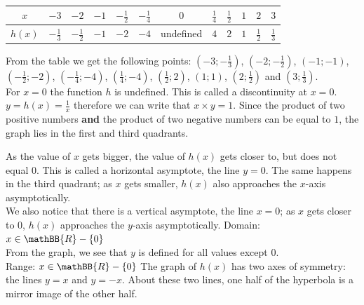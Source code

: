 \begin{wex}
{\\
\begin{table}[H]
\begin{center}
\begin{tabular}{|c|c|c|c|c|c|c|c|c|c|c|c|}
\hline
  $x$ &  $-3$ & $-2$ & $-1$ & $-\frac{1}{2}$ & $-\frac{1}{4}$ &$0$&$\frac{1}{4}$&$\frac{1}{2}$&$1$&$2$&$3$
\\ \hline
 $h(x)$& $-\frac{1}{3}$ &$-\frac{1}{2}$&$-1$&$-2$&$-4$&undefined&$4$&$2$&$1$&$\frac{1}{2}$&$\frac{1}{3}$
\\ \hline
\end{tabular}
\end{center}
\end{table}

From the table we get the following points: $(-3; -\frac{1}{3})$, $(-2; -\frac{1}{2})$, $(-1;-1)$, $(-\frac{1}{2}; -2)$, $(-\frac{1}{4}; -4)$, $(\frac{1}{4}; -4)$, $(\frac{1}{2}; 2)$, $(1; 1)$, $(2; \frac{1}{2})$ and $(3; \frac{1}{3})$. \vspace{8pt} \\

For $x=0$ the function $h$ is undefined. This is called a discontinuity at $x=0$. \vspace{8pt} \\
$y=h(x) = \frac{1}{x}$ therefore we can write that $x \times y = 1$. Since the product of two positive numbers \textbf{and} the product of two negative numbers can be equal to $1$, the graph lies in the first and third quadrants.

As the value of $x$ gets bigger, the value of $h(x)$ gets closer to, but does not equal $0$. This is called a horizontal asymptote, the line $y=0$. The same happens in the third quadrant; as $x$ gets smaller, $h(x)$ also approaches the $x$-axis asymptotically.\vspace{8pt} \\

We also notice that there is a vertical asymptote, the line $x=0$; as $x$ gets closer to $0$, $h(x)$ approaches the $y$-axis asymptotically.
Domain: $x \in \mathBB{R} - \{0\}$\\
From the graph, we see that $y$ is defined for all values except $0$.\\
Range: $x \in \mathBB{R} - \{0\}$ 
The graph of $h(x)$ has two axes of symmetry: the lines $y=x$ and $y=-x$. About these two lines, one half of the hyperbola is a mirror image of the other half. 
}
\end{wex}




